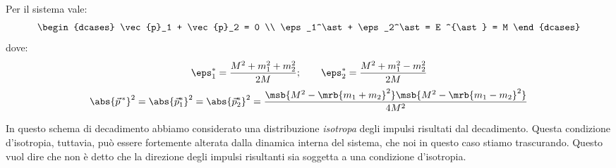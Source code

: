 Per il sistema vale:
\begin{equation}
	\begin{dcases}
		\vec{p}_1 + \vec{p}_2 = 0
		\\
		\eps_1^\ast + \eps_2^\ast = E ^{\ast} = M
	\end{dcases}
\end{equation}
dove:
\begin{equation}
	\eps_1^\ast = \frac{M^2 + m_1^2 + m_2^2}{2M};
	\qquad
	\eps_2^\ast = \frac{M^2 + m_1^2 - m_2^2}{2M}
\end{equation}
\begin{equation}
	\abs{\vec{p}^{\,\ast}}^2
	= \abs{\vec{p}_{1}^{\ast}}^{2}
	= \abs{\vec{p}_{2}^{\ast}}^{2}
	= \frac{\msb{M^2 - \mrb{m_1 + m_2}^2} \msb{M^2 -
			\mrb{m_1 - m_2}^2}}{4M^2}
	\label{eq:modulo_quadro_impulso}
\end{equation}

\begin{note}[]
	In questo schema di decadimento abbiamo considerato una distribuzione
	\textit{isotropa} degli impulsi risultati dal decadimento. Questa condizione
	d'isotropia, tuttavia, può essere fortemente alterata dalla dinamica interna
	del sistema, che noi in questo caso stiamo trascurando. Questo vuol dire che
	non è detto che la direzione degli impulsi risultanti sia soggetta a una
	condizione d'isotropia.
\end{note}

